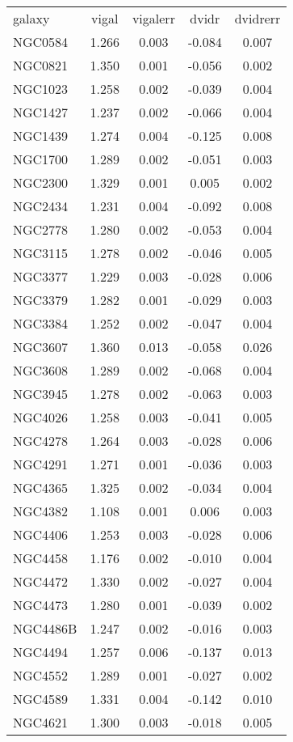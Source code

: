 \begin{tabular}{lcccc}
galaxy & vigal & vigalerr & dvidr & dvidrerr \\
NGC0584 & 1.266 & 0.003 & -0.084 & 0.007 \\
NGC0821 & 1.350 & 0.001 & -0.056 & 0.002 \\
NGC1023 & 1.258 & 0.002 & -0.039 & 0.004 \\
NGC1427 & 1.237 & 0.002 & -0.066 & 0.004 \\
NGC1439 & 1.274 & 0.004 & -0.125 & 0.008 \\
NGC1700 & 1.289 & 0.002 & -0.051 & 0.003 \\
NGC2300 & 1.329 & 0.001 &  0.005 & 0.002 \\
NGC2434 & 1.231 & 0.004 & -0.092 & 0.008 \\
NGC2778 & 1.280 & 0.002 & -0.053 & 0.004 \\
NGC3115 & 1.278 & 0.002 & -0.046 & 0.005 \\
NGC3377 & 1.229 & 0.003 & -0.028 & 0.006 \\
NGC3379 & 1.282 & 0.001 & -0.029 & 0.003 \\
NGC3384 & 1.252 & 0.002 & -0.047 & 0.004 \\
NGC3607 & 1.360 & 0.013 & -0.058 & 0.026 \\
NGC3608 & 1.289 & 0.002 & -0.068 & 0.004 \\
NGC3945 & 1.278 & 0.002 & -0.063 & 0.003 \\
NGC4026 & 1.258 & 0.003 & -0.041 & 0.005 \\
NGC4278 & 1.264 & 0.003 & -0.028 & 0.006 \\
NGC4291 & 1.271 & 0.001 & -0.036 & 0.003 \\
NGC4365 & 1.325 & 0.002 & -0.034 & 0.004 \\
NGC4382 & 1.108 & 0.001 &  0.006 & 0.003 \\
NGC4406 & 1.253 & 0.003 & -0.028 & 0.006 \\
NGC4458 & 1.176 & 0.002 & -0.010 & 0.004 \\
NGC4472 & 1.330 & 0.002 & -0.027 & 0.004 \\
NGC4473 & 1.280 & 0.001 & -0.039 & 0.002 \\
NGC4486B & 1.247 & 0.002 & -0.016 & 0.003 \\
NGC4494 & 1.257 & 0.006 & -0.137 & 0.013 \\
NGC4552 & 1.289 & 0.001 & -0.027 & 0.002 \\
NGC4589 & 1.331 & 0.004 & -0.142 & 0.010 \\
NGC4621 & 1.300 & 0.003 & -0.018 & 0.005 \\

\end{tabular}
